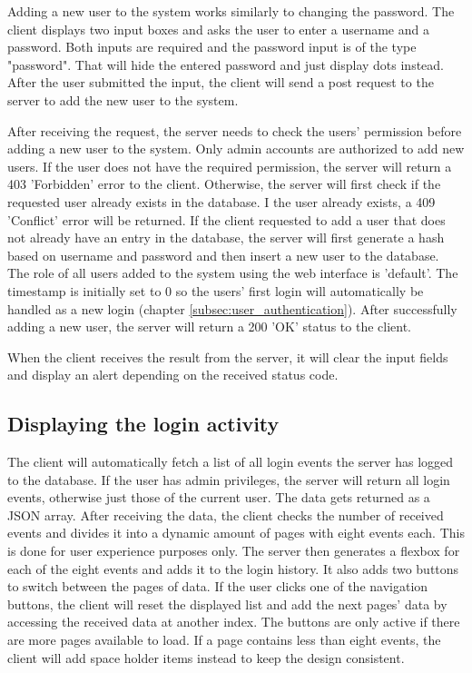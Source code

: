 Adding a new user to the system works similarly to changing the password. The client displays two input boxes and asks the user to enter a username and a password. Both inputs are required and the password input is of the type "password". That will hide the entered password and just display dots instead. After the user submitted the input, the client will send a post request to the server to add the new user to the system.

After receiving the request, the server needs to check the users' permission before adding a new user to the system. Only admin accounts are authorized to add new users. If the user does not have the required permission, the server will return a 403 'Forbidden' error to the client. Otherwise, the server will first check if the requested user already exists in the database.  I the user already exists, a 409 'Conflict' error will be returned. If the client requested to add a user that does not already have an entry in the database,  the server will first generate a hash based on username and password and then insert a new user to the database. The role of all users added to the system using the web interface is 'default'. The timestamp is initially set to 0 so the users' first login will automatically be handled as a new login (chapter \ref{subsec:user_authentication}). After successfully adding a new user, the server will return a 200 'OK' status to the client.

When the client receives the result from the server, it will clear the input fields and display an alert depending on the received status code.



\subsection{Displaying the login activity}
\label{subsec:displaying_the_login_activity}

The client will automatically fetch a list of all login events the server has logged to the database. If the user has admin privileges, the server will return all login events, otherwise just those of the current user. The data gets returned as a JSON array.
After receiving the data, the client checks the number of received events and divides it into a dynamic amount of pages with eight events each. This is done for user experience purposes only. The server then generates a flexbox for each of the eight events and adds it to the login history. It also adds two buttons to switch between the pages of data.
If the user clicks one of the navigation buttons, the client will reset the displayed list and add the next pages' data by accessing the received data at another index.  The buttons are only active if there are more pages available to load.
If a page contains less than eight events, the client will add space holder items instead to keep the design consistent.

